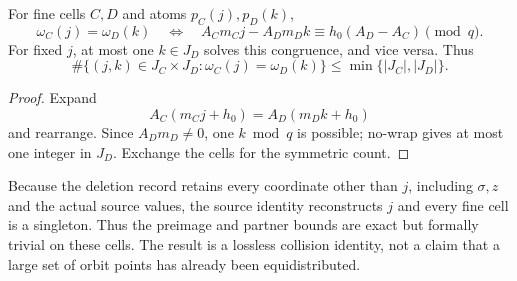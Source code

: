 \begin{proposition}
\label{prop:correct-cross-collision}
For fine cells \(C,D\) and atoms
\(p_C(j),p_D(k)\),
\begin{equation}
 \omega_C(j)=\omega_D(k)
 \quad\Longleftrightarrow\quad
 A_Cm_Cj-A_Dm_Dk
 \equiv h_0(A_D-A_C)\pmod q.
\label{eq:correct-cross-congruence}
\end{equation}
For fixed \(j\), at most one \(k\in J_D\) solves this congruence, and
vice versa.  Thus
\begin{equation}
 \#\{(j,k)\in J_C\times J_D:
 \omega_C(j)=\omega_D(k)\}
 \le\min\{|J_C|,|J_D|\}.
\label{eq:correct-cross-count}
\end{equation}
\end{proposition}

\begin{proof}
Expand
\[
 A_C(m_Cj+h_0)=A_D(m_Dk+h_0)
\]
and rearrange.  Since \(A_Dm_D\ne0\), one \(k\bmod q\) is possible;
no-wrap gives at most one integer in \(J_D\).  Exchange the cells
for the symmetric count.
\end{proof}

\begin{remark}
Because the deletion record retains every coordinate other than
\(j\), including \(\sigma,z\) and the actual source values, the
source identity reconstructs \(j\) and every fine cell is a
singleton.  Thus the preimage and partner bounds are exact but
formally trivial on these cells.  The result is a lossless collision
identity, not a claim that a large set of orbit points has already
been equidistributed.
\end{remark}
